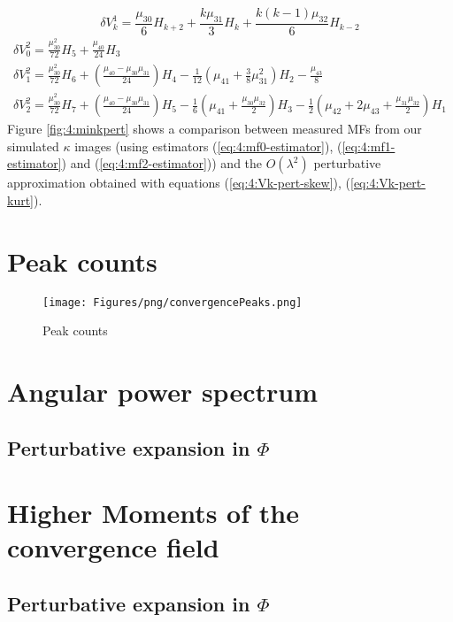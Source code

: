 \begin{equation}
\label{eq:4:Vk-pert-skew}
\delta V^1_k = \frac{\mu_{30}}{6}H_{k+2} + \frac{k\mu_{31}}{3}H_k + \frac{k(k-1)\mu_{32}}{6}H_{k-2}
\end{equation}
%
\begin{equation}
\label{eq:4:Vk-pert-kurt}
\begin{gathered}
\displaystyle \delta V^2_0 = \frac{\mu_{30}^2}{72}H_5 + \frac{\mu_{40}}{24}H_3 \\
\displaystyle \delta V^2_1 = \frac{\mu_{30}^2}{72}H_6 + \left(\frac{\mu_{40}-\mu_{30}\mu_{31}}{24}\right)H_4 - \frac{1}{12}\left(\mu_{41}+\frac{3}{8}\mu_{31}^2\right)H_2 - \frac{\mu_{43}}{8}  \\ 
\displaystyle \delta V^2_2 = \frac{\mu_{30}^2}{72}H_7 + \left(\frac{\mu_{40}-\mu_{30}\mu_{31}}{24}\right)H_5 - \frac{1}{6}\left(\mu_{41}+\frac{\mu_{30}\mu_{32}}{2}\right)H_3 - \frac{1}{2}\left(\mu_{42}+2\mu_{43}+\frac{\mu_{31}\mu_{32}}{2}\right)H_1 
\end{gathered}
\end{equation}
%
Figure \ref{fig:4:minkpert} shows a comparison between measured MFs from our simulated $\kappa$ images (using estimators (\ref{eq:4:mf0-estimator}), (\ref{eq:4:mf1-estimator}) and (\ref{eq:4:mf2-estimator})) and the $O(\lambda^2)$ perturbative approximation obtained with equations (\ref{eq:4:Vk-pert-skew}), (\ref{eq:4:Vk-pert-kurt}).  


\section{Peak counts}

%
\begin{figure}
\begin{center}
\texttt{[image: Figures/png/convergencePeaks.png]}
\end{center}
\caption{Peak counts}
\label{fig:4:peaks}
\end{figure}
%


\section{Angular power spectrum}

\subsection{Perturbative expansion in $\Phi$}


\section{Higher Moments of the convergence field}

\subsection{Perturbative expansion in $\Phi$}

